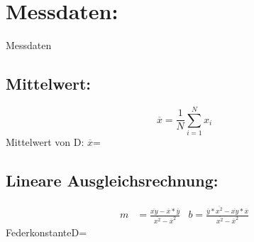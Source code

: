\section{Messdaten:} 
    
\begin{table}
    \centering
     
    \caption{Messdaten}
    \label{tab:data}
\end{table}
    \subsection{Mittelwert:}
    \begin{equation}\label{eq.mean}
        \overline{x} = \frac{1}{N}\sum\limits_{i=1}^{N} x_i
    \end{equation}
    Mittelwert von D: $\overline{x}$\:=\:

    \subsection{Lineare Ausgleichsrechnung:}
    \begin{align}\label{eq.linreg}
        m &= \frac{\overline{xy}-\overline{x}* \overline{y}}{\overline{x^2}-\overline{x}^2} 
        &b = \frac{\overline{y}* \overline{x^2}-\overline{xy}* \overline{x}}{\overline{x^2}- \overline{x}^2}
    \end{align}
    Federkonstante\:D\:=\:

    
    


